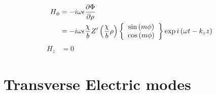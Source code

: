 \documentclass[twoside, a4paper]{article}
\begin{document}
\begin{align*}
H_\phi	& = - i \omega \epsilon \frac{\partial \Phi}{\partial \rho} \\
		& = - i \omega \epsilon \frac{\chi}{b}
			Z' \left( \frac{\chi}{b} \rho \right)
			\left\{
			\begin{array}{c}
			\sin \left( m \phi \right) \\
			\cos \left( m \phi \right)
			\end{array}
			\right\}
			\exp i \left( \omega t - k_z z \right)	 
\end{align*}
\begin{align*}
H_z & = 0 
\quad \quad \quad \quad \quad \quad \quad \quad \quad \quad
\quad \quad \quad \quad \quad \quad \quad \quad \quad \quad
\end{align*}

\section{Transverse Electric modes}
\end{document}
